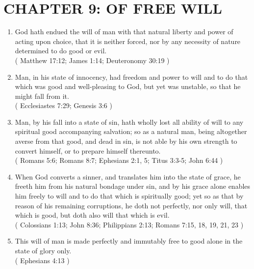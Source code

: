 \documentclass[12pt,a4paper]{book}
\begin{document}
\chapter{CHAPTER 9: OF FREE WILL}
\label{ch-fre-wil}
\begin{enumerate}
\item God hath endued the will of man with that natural liberty and power of acting upon choice, that it is neither forced, nor by any necessity of nature determined to do good or evil.\\
( Matthew 17:12; James 1:14; Deuteronomy 30:19 )
\item Man, in his state of innocency, had freedom and power to will and to do that which was good and well-pleasing to God, but yet was unstable, so that he might fall from it.\\
( Ecclesiastes 7:29; Genesis 3:6 )
\item Man, by his fall into a state of sin, hath wholly lost all ability of will to any spiritual good accompanying salvation; so as a natural man, being altogether averse from that good, and dead in sin, is not able by his own strength to convert himself, or to prepare himself thereunto.\\
( Romans 5:6; Romans 8:7; Ephesians 2:1, 5; Titus 3:3-5; John 6:44 )
\item When God converts a sinner, and translates him into the state of grace, he freeth him from his natural bondage under sin, and by his grace alone enables him freely to will and to do that which is spiritually good; yet so as that by reason of his remaining corruptions, he doth not perfectly, nor only will, that which is good, but doth also will that which is evil.\\
( Colossians 1:13; John 8:36; Philippians 2:13; Romans 7:15, 18, 19, 21, 23 )
\item This will of man is made perfectly and immutably free to good alone in the state of glory only.\\
( Ephesians 4:13 )
\end{enumerate}
\end{document}
